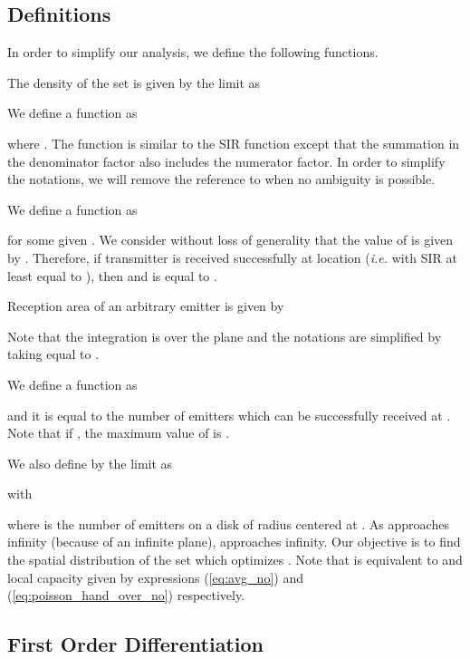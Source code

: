 \documentclass[12pt,english]{article}
\begin{document}
\subsection{Definitions}

In order to simplify our analysis, we define the following functions.
\begin{compactenum}

\item The density of the set  is given by the limit as

\item We define a function  as
 
where \mbox{}. The function  is similar to the SIR function  except that the summation in the denominator factor also includes the numerator factor. In order to simplify the notations, we will remove the reference to  when no ambiguity is possible. 
\item We define a function  as 
 
for some given . We consider without loss of generality that the value of  is given by \mbox{}. Therefore, if transmitter  is received successfully at location  ({\it i.e.} with SIR at least equal to ), then \mbox{} and  is equal to .
\item Reception area of an arbitrary emitter  is given by 

Note that the integration is over the plane and the notations are simplified by taking  equal to . 
\item We define a function  as
 
and it is equal to the number of emitters which can be successfully received at . Note that if \mbox{}, the maximum value of  is . 
\item We also define  by the limit as

with

where  is the number of emitters on a disk of radius  centered at . As  approaches infinity (because of an infinite plane),  approaches infinity. Our objective is to find the spatial distribution of the set  which optimizes . Note that  is equivalent to  and local capacity given by expressions (\ref{eq:avg_no}) and (\ref{eq:poisson_hand_over_no}) respectively. 
\end{compactenum}

\subsection{First Order Differentiation}
\label{sec:grid_first_order}
\end{document}
